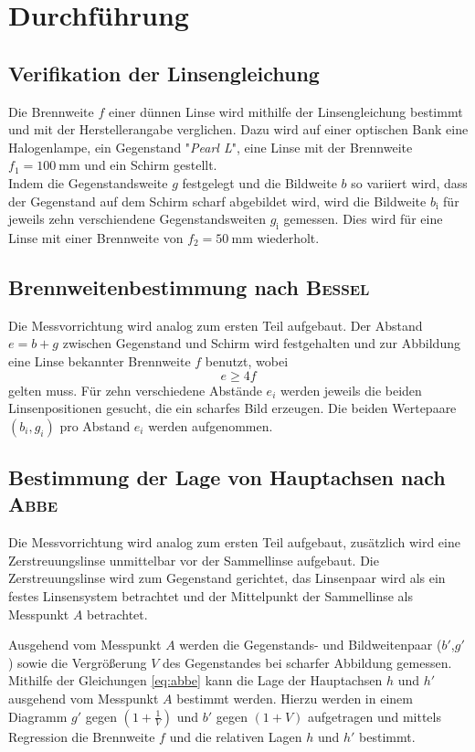 \section{Durchführung}
\label{sec:Durchfuehrung}
\subsection{Verifikation der Linsengleichung}
Die Brennweite $f$ einer dünnen Linse wird mithilfe der Linsengleichung bestimmt und mit der Herstellerangabe verglichen.
Dazu wird auf einer optischen Bank eine Halogenlampe, ein Gegenstand "\emph{Pearl L}",  eine Linse mit der Brennweite $f_1=\SI{100}{\milli\meter}$ und ein Schirm gestellt. \\
Indem die Gegenstandsweite $g$ festgelegt und die Bildweite $b$ so variiert wird, dass der Gegenstand auf dem Schirm scharf abgebildet wird, wird die Bildweite $b_\text{i}$ für jeweils zehn verschiendene Gegenstandsweiten $g_\text{i}$ gemessen.
Dies wird für eine Linse mit einer Brennweite von $f_2=\SI{50}{\milli\meter}$ wiederholt.

\subsection{Brennweitenbestimmung nach \textsc{Bessel}}
Die Messvorrichtung wird analog zum ersten Teil aufgebaut.
Der Abstand \\$e=b+g$ zwischen Gegenstand und Schirm wird festgehalten und zur Abbildung eine Linse bekannter Brennweite $f$ benutzt, wobei 
\begin{equation}
	e\ge4f
\end{equation}
gelten muss.
Für zehn verschiedene Abstände $e_i$ werden jeweils die beiden Linsenpositionen gesucht, die ein scharfes Bild erzeugen. 
Die beiden Wertepaare $(b_i,g_i)$ pro Abstand $e_i$ werden aufgenommen.

\subsection{Bestimmung der Lage von Hauptachsen nach \textsc{Abbe}}
Die Messvorrichtung wird analog zum ersten Teil aufgebaut, zusätzlich wird eine Zerstreuungslinse unmittelbar vor der Sammellinse aufgebaut.
Die Zerstreuungslinse wird zum Gegenstand gerichtet, das Linsenpaar wird als ein festes Linsensystem betrachtet und der Mittelpunkt der Sammellinse als Messpunkt $A$ betrachtet.

Ausgehend vom Messpunkt $A$ werden die Gegenstands- und Bildweitenpaar ($b'$,$g'$) sowie die Vergrößerung $V$ des Gegenstandes bei scharfer Abbildung gemessen. Mithilfe der Gleichungen \eqref{eq:abbe} kann die Lage der Hauptachsen $h$ und $h'$ ausgehend vom Messpunkt $A$ bestimmt werden.
Hierzu werden in einem Diagramm
$g′$ gegen $(1+\frac{1}{V})$ und $b′$ gegen $(1+V)$ aufgetragen und mittels Regression die Brennweite $f$ und die relativen Lagen $h$ und $h'$ bestimmt.

\newpage